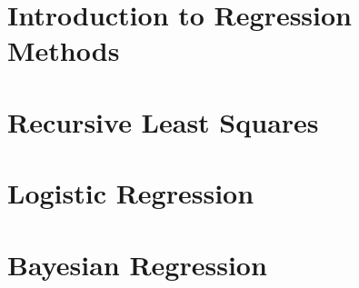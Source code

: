 \chapter{Introduction to Regression Methods}
\label{chapter:regression_intro}

\chapter{Recursive Least Squares}

\chapter{Logistic Regression}

\chapter{Bayesian Regression}



